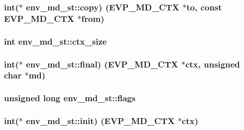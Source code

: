 \subsubsection[{\texorpdfstring{copy}{copy}}]{\setlength{\rightskip}{0pt plus 5cm}int($\ast$ env\+\_\+md\+\_\+st\+::copy) ({\bf E\+V\+P\+\_\+\+M\+D\+\_\+\+C\+TX} $\ast$to, const {\bf E\+V\+P\+\_\+\+M\+D\+\_\+\+C\+TX} $\ast$from)}\hypertarget{structenv__md__st_ac616c2dbbb6a5b70cca668db44500840}{}\label{structenv__md__st_ac616c2dbbb6a5b70cca668db44500840}
\subsubsection[{\texorpdfstring{ctx\+\_\+size}{ctx_size}}]{\setlength{\rightskip}{0pt plus 5cm}int env\+\_\+md\+\_\+st\+::ctx\+\_\+size}\hypertarget{structenv__md__st_a3c34817fb557d912821c8f06ae5945ba}{}\label{structenv__md__st_a3c34817fb557d912821c8f06ae5945ba}
\subsubsection[{\texorpdfstring{final}{final}}]{\setlength{\rightskip}{0pt plus 5cm}int($\ast$ env\+\_\+md\+\_\+st\+::final) ({\bf E\+V\+P\+\_\+\+M\+D\+\_\+\+C\+TX} $\ast$ctx, unsigned char $\ast$md)}\hypertarget{structenv__md__st_aa04a65c96264e232f926f2ddf03a5fd3}{}\label{structenv__md__st_aa04a65c96264e232f926f2ddf03a5fd3}
\subsubsection[{\texorpdfstring{flags}{flags}}]{\setlength{\rightskip}{0pt plus 5cm}unsigned long env\+\_\+md\+\_\+st\+::flags}\hypertarget{structenv__md__st_a5096c8e255bb2b2100aeae4d50af2fcb}{}\label{structenv__md__st_a5096c8e255bb2b2100aeae4d50af2fcb}
\subsubsection[{\texorpdfstring{init}{init}}]{\setlength{\rightskip}{0pt plus 5cm}int($\ast$ env\+\_\+md\+\_\+st\+::init) ({\bf E\+V\+P\+\_\+\+M\+D\+\_\+\+C\+TX} $\ast$ctx)}\hypertarget{structenv__md__st_afe1f83efe755ab7f5887ff46aa1269be}{}\label{structenv__md__st_afe1f83efe755ab7f5887ff46aa1269be}
